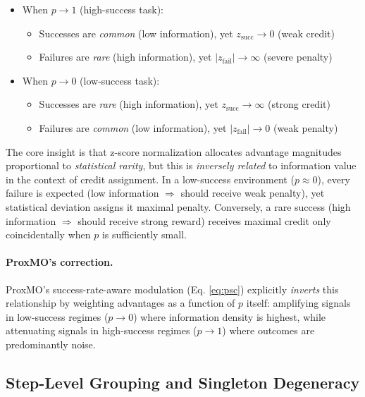 \documentclass[11pt]{article}
\begin{document}
\begin{itemize}
\item When $p \to 1$ (high-success task): 
\begin{itemize}
\item Successes are \textit{common} (low information), yet $z_{\text{succ}} \to 0$ (weak credit)
\item Failures are \textit{rare} (high information), yet $|z_{\text{fail}}| \to \infty$ (severe penalty)
\end{itemize}

\item When $p \to 0$ (low-success task):
\begin{itemize}
\item Successes are \textit{rare} (high information), yet $z_{\text{succ}} \to \infty$ (strong credit)
\item Failures are \textit{common} (low information), yet $|z_{\text{fail}}| \to 0$ (weak penalty)
\end{itemize}
\end{itemize}

The core insight is that z-score normalization allocates advantage magnitudes proportional to \textit{statistical rarity}, but this is \textit{inversely related} to information value in the context of credit assignment. In a low-success environment ($p \approx 0$), every failure is expected (low information $\Rightarrow$ should receive weak penalty), yet statistical deviation assigns it maximal penalty. Conversely, a rare success (high information $\Rightarrow$ should receive strong reward) receives maximal credit only coincidentally when $p$ is sufficiently small.

\paragraph{ProxMO's correction.}
ProxMO's success-rate-aware modulation (Eq. \ref{eq:psc}) explicitly \textit{inverts} this relationship by weighting advantages as a function of $p$ itself: amplifying signals in low-success regimes ($p \to 0$) where information density is highest, while attenuating signals in high-success regimes ($p \to 1$) where outcomes are predominantly noise.

\subsection{Step-Level Grouping and Singleton Degeneracy}
\label{sec:appendix_singleton_analysis}
\end{document}
